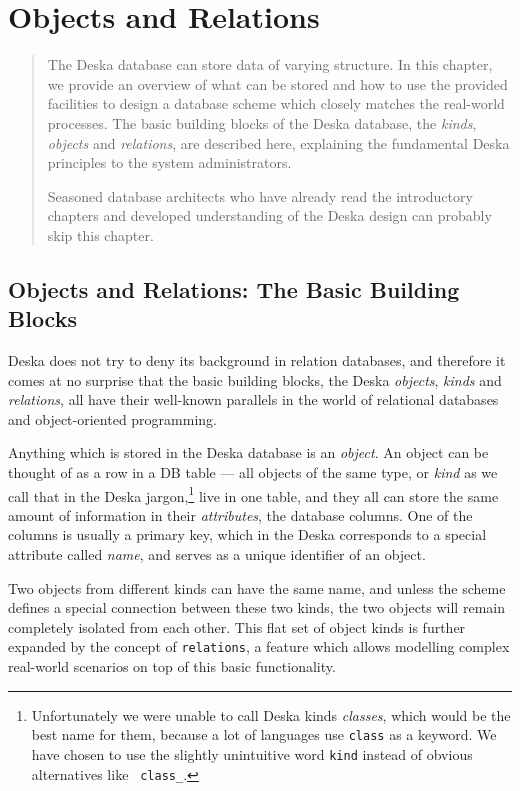 \documentclass[deska]{subfiles}
\begin{document}
\chapter{Objects and Relations}

\begin{abstract}
The Deska database can store data of varying structure.  In this chapter, we provide an overview of what can be stored
and how to use the provided facilities to design a database scheme which closely matches the real-world processes.  The
basic building blocks of the Deska database, the {\em kinds}, {\em objects} and {\em relations}, are described here,
explaining the fundamental Deska principles to the system administrators.

Seasoned database architects who have already read the introductory chapters and developed understanding of the Deska
design can probably skip this chapter.
\end{abstract}

\section{Objects and Relations: The Basic Building Blocks}
\label{sec:objects-and-relations}

Deska does not try to deny its background in relation databases, and therefore it comes at no surprise that the basic
building blocks, the Deska {\em objects}, {\em kinds} and {\em relations}, all have their well-known parallels in the
world of relational databases and object-oriented programming.

Anything which is stored in the Deska database is an {\em object}. An object can be thought of as a row in a DB table ---
all objects of the same type, or {\em kind} as we call that in the Deska jargon,\footnote{Unfortunately we were unable
to call Deska kinds {\em classes}, which would be the best name for them, because a lot of languages use {\tt class} as
a keyword.  We have chosen to use the slightly unintuitive word {\tt kind} instead of obvious alternatives like {\tt
class\_}.} live in one table, and they all can
store the same amount of information in their {\em attributes}, the database columns.  One of the columns is usually a
primary key, which in the Deska corresponds to a special attribute called {\em name}, and serves as a unique identifier
of an object.

Two objects from different kinds can have the same name, and unless the scheme defines a special connection between
these two kinds, the two objects will remain completely isolated from each other.  This flat set of object kinds is
further expanded by the concept of {\tt relations}, a feature which allows modelling complex real-world scenarios on top
of this basic functionality.
\end{document}
